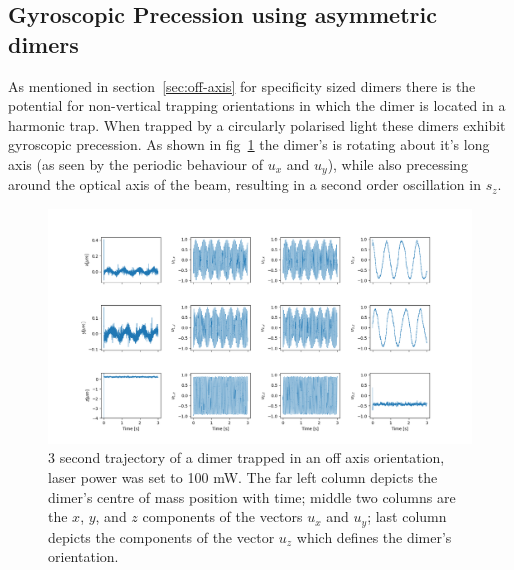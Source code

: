\subsection{Gyroscopic Precession using asymmetric dimers}
As mentioned in section~\ref{sec:off-axis} for specificity 
sized dimers there is the potential for non-vertical trapping 
orientations in which the dimer is located in a harmonic 
trap. When trapped by a circularly polarised light these 
dimers exhibit gyroscopic precession. As shown in fig~\ref{fig:gyro} 
the dimer's is rotating about it's long axis (as seen by 
the periodic behaviour of $u_x$ and $u_y$), while also precessing 
around the optical axis of the beam, resulting in a second 
order oscillation in $s_z$.
\begin{figure}[h]
	\label{fig:gyro}
	\centering
	\includegraphics[width=\linewidth]{gyroscopic_precession.png}
	\caption{3 second trajectory of a dimer trapped in an off axis orientation, laser power was set to 100 mW. The far left column depicts the dimer's centre of mass position with time; middle two columns are the $x$, $y$, and $z$ components of the vectors $u_x$ and $u_y$; last column depicts the components of the vector $u_z$ which defines the dimer's orientation.}
\end{figure}

